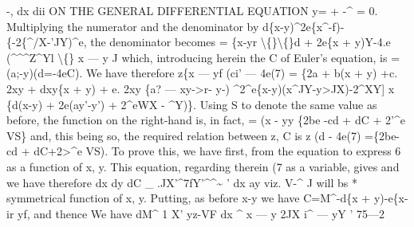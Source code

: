 \documentclass[12pt,a4paper]{article}
\begin{document}
-,
dx
dii
ON THE GENERAL DIFFERENTIAL EQUATION y= + -\textasciicircum{} = 0.
Multiplying the numerator and the denominator by
d\{x-y)\textasciicircum{}2e\{x\textasciicircum{}-f)-\{-2\{\textasciicircum{}/X-'JY)\textasciicircum{}e,
the denominator becomes
= \{x-yr \textbackslash\{\}\textbackslash\{\}d + 2e\{x + y)Y-4.e (\textasciicircum{}\textasciicircum{}\textasciicircum{}Z\textasciicircum{}Yl
\textbackslash\{\}
x --- y
J
which, introducing herein the C of Euler's
equation,
is
= (a;-y)\guillemotright{}(d=-4eC).
We have therefore
z\{x --- yf (ci' --- 4e(7) = \{2a + b(x + y) +c. 2xy + dxy\{x + y) + e. 2xy \{a? --- xy->r- y-)
\textasciicircum{}2\textasciicircum{}e\{x-y)(x\textasciicircum{}JY-y>JX)-2\textasciicircum{}XY] x \{d(x-y) + 2e(ay'-y') + 2\textasciicircum{}eWX - \textasciicircum{}Y)\}.
Using S
to denote
the
same value as
before,
the
function
on
the
right-hand
is,
in
fact,
= (x - yy \{2be -cd + dC + 2'\textasciicircum{}e VS\}
and,
this being
so, the
required relation between
z, C
is
z (d\guillemotright{} - 4e(7) =\{2be-cd + dC+2>\textasciicircum{}e VS).
To prove
this, we have
first, from the equation
to
express
6
as
a
function
of
x,
y.
This equation, regarding
therein
(7 as
a
variable,
gives
and we have therefore
dx
dy
dC \_
.JX'\textasciicircum{}7fY'\textasciicircum{}\textasciicircum{}\textasciitilde{}
'
dx
ay
viz. V-\textasciicircum{} J
will bs * symmetrical function
of x,
y.
Putting, as before
x-y
we have
C=M\textasciicircum{}-d\{x + y)-e\{x-ir yf,
and thence
We have
dM\textasciicircum{}
1
X'
yz-VF
dx \textasciicircum{} x --- y 2\guillemotright{}JX
i\textasciicircum{} --- yY
'
75---2
\end{document}
